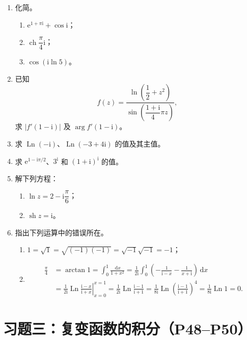 \documentclass[UTF8,11pt,a4paper]{ctexart}
\newcommand{\dd}{\,\mathrm{d}}
\newcommand{\ee}{\mathrm{e}}
\newcommand{\ii}{\mathrm{i}}
\newcommand{\Ln}{\operatorname{Ln}}
\newcommand{\sh}{\operatorname{sh}}
\newcommand{\ch}{\operatorname{ch}}
\begin{document}
\begin{enumerate}
\item 化简。
  \begin{enumerate}
  \item $\ee^{1+\pi\ii}+\cos\ii$；
  \item $\ch\dfrac\pi4\ii$；
  \item $\cos(\ii\ln5)$。
  \end{enumerate}

\item 已知
\[
f(z)=\frac{\ln\left(\dfrac12+z^2\right)}
{\sin\left(\dfrac{1+\ii}{4}\pi z\right)},
\]
求 $|f'(1-\ii)|$ 及 $\arg f'(1-\ii)$。

\item 求 $\Ln(-\ii)$、$\Ln(-3+4\ii)$ 的值及其主值。

\item 求 $\ee^{1-\ii\pi/2}$、$3^{\ii}$ 和 $(1+\ii)^{\ii}$ 的值。

\item 解下列方程：
  \begin{enumerate}
  \item $\ln z=2-\ii\dfrac\pi6$；
  \item $\sh z=\ii$。
  \end{enumerate}

\item 指出下列运算中的错误所在。
  \begin{enumerate}
  \item $1=\sqrt1=\sqrt{(-1)(-1)}=\sqrt{-1}\sqrt{-1}=-1$；
  \item
  \[
  \begin{aligned}
  \frac\pi4&=\arctan1=\int_0^1\frac{\dd x}{1+x^2}
  =\frac1{2\ii}\int_0^1\left(-\frac1{\ii-x}-\frac1{x+\ii}\right)\dd x\\
  &=\left.\frac1{2\ii}\Ln\frac{\ii-x}{\ii+x}\right|_{x=0}^{x=1}
  =\frac1{2\ii}\Ln\frac{\ii-1}{\ii+1}
  =\frac1{8\ii}\Ln\left(\frac{\ii-1}{\ii+1}\right)^4
  =\frac1{8\ii}\Ln1=0.
  \end{aligned}
  \]
  \end{enumerate}
\end{enumerate}

\newpage
\section{习题三：复变函数的积分（P48--P50）}
\end{document}
